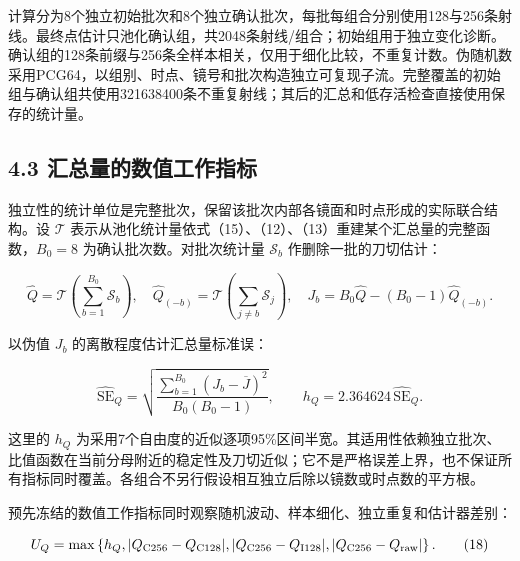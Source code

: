 \documentclass[UTF8,fontset=windows,zihao=-4]{ctexart}
\begin{document}
计算分为8个独立初始批次和8个独立确认批次，每批每组合分别使用128与256条射线。最终点估计只池化确认组，共2048条射线/组合；初始组用于独立变化诊断。确认组的128条前缀与256条全样本相关，仅用于细化比较，不重复计数。伪随机数采用PCG64，以组别、时点、镜号和批次构造独立可复现子流。完整覆盖的初始组与确认组共使用321638400条不重复射线；其后的汇总和低存活检查直接使用保存的统计量。

\subsection*{4.3 汇总量的数值工作指标}

\par\noindent\begin{minipage}{\linewidth}
独立性的统计单位是完整批次，保留该批次内部各镜面和时点形成的实际联合结构。设 \(\mathcal T\) 表示从池化统计量依式（15）、（12）、（13）重建某个汇总量的完整函数，\(B_0=8\) 为确认批次数。对批次统计量 \(\mathcal S_b\) 作删除一批的刀切估计：

\[
\widehat Q=\mathcal T\!\left(\sum_{b=1}^{B_0}\mathcal S_b\right),\quad
\widehat Q_{(-b)}=\mathcal T\!\left(\sum_{j\ne b}\mathcal S_j\right),\quad
J_b=B_0\widehat Q-(B_0-1)\widehat Q_{(-b)}.
\tag{16}
\]
\end{minipage}\par

\par\noindent\begin{minipage}{\linewidth}
以伪值 \(J_b\) 的离散程度估计汇总量标准误：

\[
\widehat{\mathrm{SE}}_Q=
\sqrt{\frac{\sum_{b=1}^{B_0}(J_b-\overline J)^2}{B_0(B_0-1)}},
\qquad h_Q=2.364624\,\widehat{\mathrm{SE}}_Q.
\tag{17}
\]
\end{minipage}\par

这里的 \(h_Q\) 为采用7个自由度的近似逐项95\%区间半宽。其适用性依赖独立批次、比值函数在当前分母附近的稳定性及刀切近似；它不是严格误差上界，也不保证所有指标同时覆盖。各组合不另行假设相互独立后除以镜数或时点数的平方根。

\par\noindent\begin{minipage}{\linewidth}
预先冻结的数值工作指标同时观察随机波动、样本细化、独立重复和估计器差别：

\[
U_Q=\max\left\{h_Q,
|Q_{\rm C256}-Q_{\rm C128}|,
|Q_{\rm C256}-Q_{\rm I128}|,
|Q_{\rm C256}-Q_{\rm raw}|\right\}.
\tag{18}
\]
\end{minipage}\par
\end{document}
